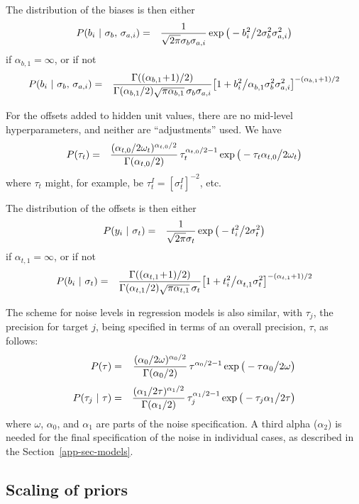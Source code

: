 \documentclass{report}[11pt]
\def\beq{\begin{eqnarray}}
\def\eeq{\end{eqnarray}}
\def\eep{\end{eqnarray}}
\begin{document}
The distribution of the biases is then either\beq
  P(b_i\ |\ \sigma_b,\,\sigma_{a,i}) & = &
    {1 \over \sqrt{2\pi} \sigma_b\sigma_{a,i}} 
    \exp \big( - b_i^2 \big/ 2\sigma_b^2\sigma_{a,i}^2 \big)
\label{priorbg}\eeq%
if $\alpha_{b,1}=\infty$, or if not\beq
  P(b_i\ |\ \sigma_b,\,\sigma_{a,i}) & = &
    {\Gamma((\alpha_{b,1}\!+\!1)/2) \over 
     \Gamma(\alpha_{b,1}/2) \sqrt{\pi\alpha_{b,1}}\, \sigma_b \sigma_{a,i}}
     \big[ 1 + b_i^2 \big/ \alpha_{b,1}^{\ }\sigma_b^2\sigma_{a,i}^2 
     \big]^{-(\alpha_{b,1}+1)/2}
\label{priorbt}\eep

For the offsets added to hidden unit values, there are no mid-level 
hyperparameters, and neither are ``adjustments'' used.  We 
have\vspace{-10pt}\beq
  P(\tau_t)
   & = & {(\alpha_{t,0}/2\omega_t)^{\alpha_{t,0}/2} 
          \over \Gamma(\alpha_{t,0}/2)}\,
         \tau_t^{\alpha_{t,0}/2-1}
         \exp \big(-\tau_t \alpha_{t,0} \big/ 2 \omega_t \big) 
\eeq%
where $\tau_t$ might, for example, be $\tau^{I}_t = [\sigma^{I}_t]^{-2}$, etc.

The distribution of the offsets is then either\beq
  P(y_i\ |\ \sigma_t) & = &
    {1 \over \sqrt{2\pi} \sigma_t} 
    \exp \big( - t_i^2 \big/ 2\sigma_t^2 \big)
\label{priortg}\eeq%
if $\alpha_{t,1}=\infty$, or if not\beq
  P(b_i\ |\ \sigma_t) & = &
    {\Gamma((\alpha_{t,1}\!+\!1)/2) \over 
     \Gamma(\alpha_{t,1}/2) \sqrt{\pi\alpha_{t,1}}\, \sigma_t}
    \big[ 1 + t_i^2 \big/ \alpha_{t,1}^{\ }\sigma_t^2\big]^{-(\alpha_{t,1}+1)/2}
\label{priortt}\eep

The scheme for noise levels in regression models is also similar, with
$\tau_j$, the precision for target $j$, being specified in terms of
an overall precision, $\tau$, as follows:\beq
  P(\tau)
   & = & {(\alpha_{0}/2\omega)^{\alpha_{0}/2} 
          \over \Gamma(\alpha_{0}/2)}\,
         \tau^{\alpha_{0}/2-1}
         \exp \big(-\tau \alpha_{0} \big/ 2 \omega \big) 
\label{noiseprior1}\\[3pt]
  P(\tau_{j}\ |\ \tau)
   & = & {(\alpha_{1}/2\tau)^{\alpha_{1}/2} 
          \over \Gamma(\alpha_{1}/2)}\,
         \tau_{j}^{\alpha_{1}/2-1}
         \exp \big(-\tau_{j} \alpha_{1} \big/ 2 \tau \big)
\label{noiseprior2}\eeq%
where $\omega$, $\alpha_0$, and $\alpha_1$ are parts of the noise
specification.  A third alpha ($\alpha_2$) is needed for the final
specification of the noise in individual cases, as described in the
Section~\ref{app-sec-models}.


\subsection*{Scaling of priors}
\end{document}
